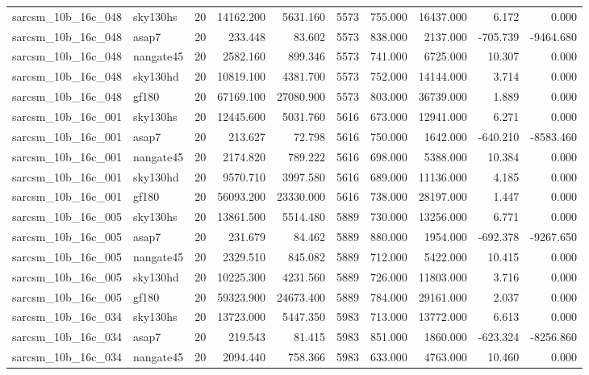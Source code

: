 \begin{tabular}{llrrrrrrrr}
sarcsm\_10b\_16c\_048 & sky130hs & 20 & 14162.200 & 5631.160 & 5573 & 755.000 & 16437.000 & 6.172 & 0.000 \\
sarcsm\_10b\_16c\_048 & asap7 & 20 & 233.448 & 83.602 & 5573 & 838.000 & 2137.000 & -705.739 & -9464.680 \\
sarcsm\_10b\_16c\_048 & nangate45 & 20 & 2582.160 & 899.346 & 5573 & 741.000 & 6725.000 & 10.307 & 0.000 \\
sarcsm\_10b\_16c\_048 & sky130hd & 20 & 10819.100 & 4381.700 & 5573 & 752.000 & 14144.000 & 3.714 & 0.000 \\
sarcsm\_10b\_16c\_048 & gf180 & 20 & 67169.100 & 27080.900 & 5573 & 803.000 & 36739.000 & 1.889 & 0.000 \\
sarcsm\_10b\_16c\_001 & sky130hs & 20 & 12445.600 & 5031.760 & 5616 & 673.000 & 12941.000 & 6.271 & 0.000 \\
sarcsm\_10b\_16c\_001 & asap7 & 20 & 213.627 & 72.798 & 5616 & 750.000 & 1642.000 & -640.210 & -8583.460 \\
sarcsm\_10b\_16c\_001 & nangate45 & 20 & 2174.820 & 789.222 & 5616 & 698.000 & 5388.000 & 10.384 & 0.000 \\
sarcsm\_10b\_16c\_001 & sky130hd & 20 & 9570.710 & 3997.580 & 5616 & 689.000 & 11136.000 & 4.185 & 0.000 \\
sarcsm\_10b\_16c\_001 & gf180 & 20 & 56093.200 & 23330.000 & 5616 & 738.000 & 28197.000 & 1.447 & 0.000 \\
sarcsm\_10b\_16c\_005 & sky130hs & 20 & 13861.500 & 5514.480 & 5889 & 730.000 & 13256.000 & 6.771 & 0.000 \\
sarcsm\_10b\_16c\_005 & asap7 & 20 & 231.679 & 84.462 & 5889 & 880.000 & 1954.000 & -692.378 & -9267.650 \\
sarcsm\_10b\_16c\_005 & nangate45 & 20 & 2329.510 & 845.082 & 5889 & 712.000 & 5422.000 & 10.415 & 0.000 \\
sarcsm\_10b\_16c\_005 & sky130hd & 20 & 10225.300 & 4231.560 & 5889 & 726.000 & 11803.000 & 3.716 & 0.000 \\
sarcsm\_10b\_16c\_005 & gf180 & 20 & 59323.900 & 24673.400 & 5889 & 784.000 & 29161.000 & 2.037 & 0.000 \\
sarcsm\_10b\_16c\_034 & sky130hs & 20 & 13723.000 & 5447.350 & 5983 & 713.000 & 13772.000 & 6.613 & 0.000 \\
sarcsm\_10b\_16c\_034 & asap7 & 20 & 219.543 & 81.415 & 5983 & 851.000 & 1860.000 & -623.324 & -8256.860 \\
sarcsm\_10b\_16c\_034 & nangate45 & 20 & 2094.440 & 758.366 & 5983 & 633.000 & 4763.000 & 10.460 & 0.000 \\

\end{tabular}
